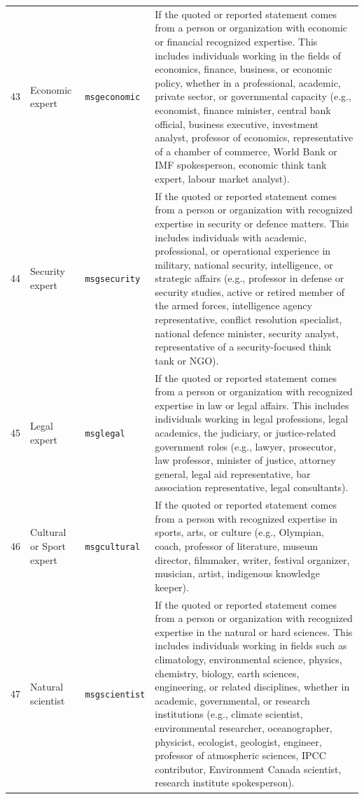 \documentclass[12pt]{article}
\renewcommand\_{\texttt{\detokenize{_}\allowbreak}}
\begin{document}
{\begin{longtable}{p{0.5cm}p{4.5cm}p{2.8cm}p{13.5cm}}
43 & Economic expert & \texttt{msg\_economic} & If the quoted or reported statement comes from a person or organization with economic or financial recognized expertise. This includes individuals working in the fields of economics, finance, business, or economic policy, whether in a professional, academic, private sector, or governmental capacity (e.g., economist, finance minister, central bank official, business executive, investment analyst, professor of economics, representative of a chamber of commerce, World Bank or IMF spokesperson, economic think tank expert, labour market analyst). \\
44 & Security expert & \texttt{msg\_security} & If the quoted or reported statement comes from a person or organization with recognized expertise in security or defence matters. This includes individuals with academic, professional, or operational experience in military, national security, intelligence, or strategic affairs (e.g., professor in defense or security studies, active or retired member of the armed forces, intelligence agency representative, conflict resolution specialist, national defence minister, security analyst, representative of a security-focused think tank or NGO). \\
45 & Legal expert & \texttt{msg\_legal} & If the quoted or reported statement comes from a person or organization with recognized expertise in law or legal affairs. This includes individuals working in legal professions, legal academics, the judiciary, or justice-related government roles (e.g., lawyer, prosecutor, law professor, minister of justice, attorney general, legal aid representative, bar association representative, legal consultants). \\
46 & Cultural or Sport expert & \texttt{msg\_cultural} & If the quoted or reported statement comes from a person with recognized expertise in sports, arts, or culture (e.g., Olympian, coach, professor of literature, museum director, filmmaker, writer, festival organizer, musician, artist, indigenous knowledge keeper). \\
47 & Natural scientist & \texttt{msg\_scientist} & If the quoted or reported statement comes from a person or organization with recognized expertise in the natural or hard sciences. This includes individuals working in fields such as climatology, environmental science, physics, chemistry, biology, earth sciences, engineering, or related disciplines, whether in academic, governmental, or research institutions (e.g., climate scientist, environmental researcher, oceanographer, physicist, ecologist, geologist, engineer, professor of atmospheric sciences, IPCC contributor, Environment Canada scientist, research institute spokesperson). \\

\end{longtable}}
\end{document}
